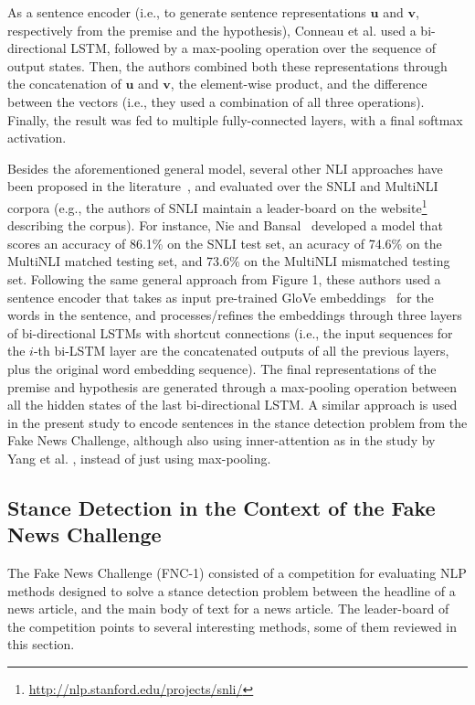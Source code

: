 As a sentence encoder (i.e., to generate sentence representations $\boldsymbol{u}$ and $\boldsymbol{v}$, respectively from the premise and the hypothesis), Conneau et al. used a bi-directional LSTM, followed by a max-pooling operation over the sequence of output states. Then, the authors combined both these representations through the concatenation of $\boldsymbol{u}$ and $\boldsymbol{v}$, the element-wise product, and the difference between the vectors (i.e., they used a combination of all three operations). Finally, the result was fed to multiple fully-connected layers, with a final softmax activation. 

Besides the aforementioned general model, several other NLI approaches have been proposed in the literature~\cite{shortcut,gong2017natural,chen2017enhanced}, and evaluated over the SNLI and MultiNLI corpora (e.g., the authors of SNLI maintain a leader-board on the website\footnote{\scriptsize{\url{http://nlp.stanford.edu/projects/snli/}}} describing the corpus). For instance, Nie and Bansal~\cite{shortcut} developed a model that scores an accuracy of 86.1\% on the SNLI test set, an acuracy of 74.6\% on the MultiNLI matched testing set, and 73.6\% on the MultiNLI mismatched testing set. Following the same general approach from Figure 1, these authors used a sentence encoder that takes as input pre-trained GloVe embeddings~\cite{glove} for the words in the sentence, and processes/refines the embeddings through three layers of bi-directional LSTMs with shortcut connections (i.e., the input sequences for the $i$-th bi-LSTM layer are the concatenated outputs of all the previous layers, plus the original word embedding sequence). The final representations of the premise and hypothesis are generated through a max-pooling operation between all the hidden states of the last bi-directional LSTM. A similar approach is used in the present study to encode sentences in the stance detection problem from the Fake News Challenge, although also using inner-attention as in the study by Yang et al. \cite{hierarchical}, instead of just using max-pooling.

\subsection{Stance Detection in the Context of the Fake News Challenge}

The Fake News Challenge (FNC-1) consisted of a competition for evaluating NLP methods designed to solve a stance detection problem between the headline of a news article, and the main body of text for a news article. The leader-board of the competition points to several interesting methods, some of them reviewed in this section. 

